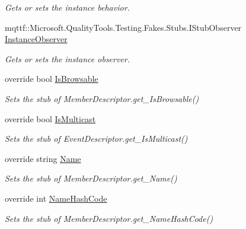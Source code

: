 \begin{DoxyCompactItemize}
\begin{DoxyCompactList}\small\item\em Gets or sets the instance behavior.\end{DoxyCompactList}\item 
mqttf\-::\-Microsoft.\-Quality\-Tools.\-Testing.\-Fakes.\-Stubs.\-I\-Stub\-Observer \hyperlink{class_system_1_1_component_model_1_1_fakes_1_1_stub_event_descriptor_a7641d5d94f8c00ec382413ff3197454c}{Instance\-Observer}
\begin{DoxyCompactList}\small\item\em Gets or sets the instance observer.\end{DoxyCompactList}\item 
override bool \hyperlink{class_system_1_1_component_model_1_1_fakes_1_1_stub_event_descriptor_a59e8d6a8ab7ab36f36feed1aa53c4ad9}{Is\-Browsable}
\begin{DoxyCompactList}\small\item\em Sets the stub of Member\-Descriptor.\-get\-\_\-\-Is\-Browsable()\end{DoxyCompactList}\item 
override bool \hyperlink{class_system_1_1_component_model_1_1_fakes_1_1_stub_event_descriptor_ab03602cf5a00b40b7c3bdfe1eaa0a1ff}{Is\-Multicast}
\begin{DoxyCompactList}\small\item\em Sets the stub of Event\-Descriptor.\-get\-\_\-\-Is\-Multicast()\end{DoxyCompactList}\item 
override string \hyperlink{class_system_1_1_component_model_1_1_fakes_1_1_stub_event_descriptor_af572db1efe4c712f15d6b95c5d2041e3}{Name}
\begin{DoxyCompactList}\small\item\em Sets the stub of Member\-Descriptor.\-get\-\_\-\-Name()\end{DoxyCompactList}\item 
override int \hyperlink{class_system_1_1_component_model_1_1_fakes_1_1_stub_event_descriptor_ade3d3c43a0ecf55ec45b40bc5044b98f}{Name\-Hash\-Code}
\begin{DoxyCompactList}\small\item\em Sets the stub of Member\-Descriptor.\-get\-\_\-\-Name\-Hash\-Code()\end{DoxyCompactList}\end{DoxyCompactItemize}


